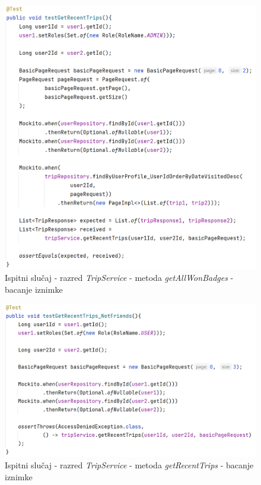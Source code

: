         \begin{figure}[H]
            \includegraphics[scale=0.9]{slike/unit_test_trip_recent.png} 
              \centering
            \caption{Ispitni slučaj - razred \textit{TripService} - metoda \textit{getAllWonBadges} - bacanje iznimke}
        \end{figure}

        \begin{figure}[H]
            \includegraphics[scale=0.9]{slike/unit_test_trip_not_friends.png} 
              \centering
            \caption{Ispitni slučaj - razred \textit{TripService} - metoda \textit{getRecentTrips} - bacanje iznimke}
        \end{figure}

